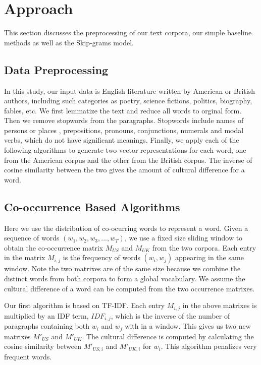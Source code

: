 \section{Approach}
This section discusses the preprocessing of our text corpora, our
simple baseline methods as well as the Skip-grams model.

\subsection{Data Preprocessing}

In this study, our input data is English literature written by 
American or British authors, including such categories as poetry, 
science fictions, politics, biography, fables, etc.
We first lemmatize the text and reduce all words to orginal form. 
Then we remove stopwords from the paragraphs. 
Stopwords include names of persons or places \cite{names}, 
prepositions, pronouns, 
conjunctions, numerals and modal verbs, which do not have significant
meanings.
Finally, we apply each of the following algorithms to generate two vector
representations for each word, one from the American corpus and the other
from the British corpus. The inverse of cosine similarity between the
two gives the amount of cultural difference for a word.

\subsection{Co-occurrence Based Algorithms}
Here we use the distribution of co-ocurring words to represent a word. 
Given a sequence of words $(w_1, w_2, w_3,...,w_T)$, we use a fixed size
sliding window to obtain the co-occurrence matrix $M_{US}$ and $M_{UK}$ 
from the two corpora. Each entry in the matrix $M_{i, j}$ is the frequency 
of words $(w_i, w_j)$ appearing in the same window. Note the two matrixes
are of the same size because we combine the distinct words from both corpora
to form a global vocabulary.  We assume the cultural difference of a word
can be computed from the two occurrence matrixes. 

Our first algorithm is based on TF-IDF. Each entry $M_{i, j}$ 
in the above matrixes is multiplied by an IDF term, $IDF_{i, j}$, which
is the inverse of the number of paragraphs containing 
both $w_i$ and $w_j$ with in a window. This gives us two new
matrixes $M'_{US}$ and $M'_{UK}$. The cultural difference is computed by
calculating the cosine similarity between $M'_{US, i}$ and $M'_{UK, i}$ 
for $w_i$. This algorithm penalizes very frequent words. 

